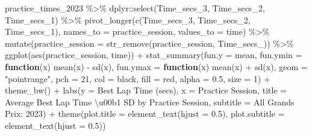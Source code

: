 \documentclass[
]{book}
\newenvironment{Shaded}{\begin{snugshade}}{\end{snugshade}}
\newcommand{\AttributeTok}[1]{\textcolor[rgb]{0.77,0.63,0.00}{#1}}
\newcommand{\ControlFlowTok}[1]{\textcolor[rgb]{0.13,0.29,0.53}{\textbf{#1}}}
\newcommand{\DecValTok}[1]{\textcolor[rgb]{0.00,0.00,0.81}{#1}}
\newcommand{\FloatTok}[1]{\textcolor[rgb]{0.00,0.00,0.81}{#1}}
\newcommand{\FunctionTok}[1]{\textcolor[rgb]{0.00,0.00,0.00}{#1}}
\newcommand{\NormalTok}[1]{#1}
\newcommand{\SpecialCharTok}[1]{\textcolor[rgb]{0.00,0.00,0.00}{#1}}
\newcommand{\StringTok}[1]{\textcolor[rgb]{0.31,0.60,0.02}{#1}}
\begin{document}
\begin{Shaded}
\begin{Highlighting}[]
\NormalTok{practice\_times\_2023 }\SpecialCharTok{\%\textgreater{}\%}
\NormalTok{  dplyr}\SpecialCharTok{::}\FunctionTok{select}\NormalTok{(Time\_secs\_3, Time\_secs\_2, Time\_secs\_1) }\SpecialCharTok{\%\textgreater{}\%}
  \FunctionTok{pivot\_longer}\NormalTok{(}\FunctionTok{c}\NormalTok{(Time\_secs\_3, Time\_secs\_2, Time\_secs\_1), }\AttributeTok{names\_to =} \StringTok{\textquotesingle{}practice\_session\textquotesingle{}}\NormalTok{, }\AttributeTok{values\_to =} \StringTok{\textquotesingle{}time\textquotesingle{}}\NormalTok{) }\SpecialCharTok{\%\textgreater{}\%}
  \FunctionTok{mutate}\NormalTok{(}\AttributeTok{practice\_session =} \FunctionTok{str\_remove}\NormalTok{(practice\_session, }\StringTok{\textquotesingle{}Time\_secs\_\textquotesingle{}}\NormalTok{)) }\SpecialCharTok{\%\textgreater{}\%}
  \FunctionTok{ggplot}\NormalTok{(}\FunctionTok{aes}\NormalTok{(practice\_session, time)) }\SpecialCharTok{+}
  \FunctionTok{stat\_summary}\NormalTok{(}\AttributeTok{fun.y =}\NormalTok{ mean,}
               \AttributeTok{fun.ymin =} \ControlFlowTok{function}\NormalTok{(x) }\FunctionTok{mean}\NormalTok{(x) }\SpecialCharTok{{-}} \FunctionTok{sd}\NormalTok{(x), }
               \AttributeTok{fun.ymax =} \ControlFlowTok{function}\NormalTok{(x) }\FunctionTok{mean}\NormalTok{(x) }\SpecialCharTok{+} \FunctionTok{sd}\NormalTok{(x), }
               \AttributeTok{geom =} \StringTok{"pointrange"}\NormalTok{,}
               \AttributeTok{pch =} \DecValTok{21}\NormalTok{, }\AttributeTok{col =} \StringTok{\textquotesingle{}black\textquotesingle{}}\NormalTok{, }\AttributeTok{fill =}  \StringTok{\textquotesingle{}red\textquotesingle{}}\NormalTok{, }\AttributeTok{alpha =} \FloatTok{0.5}\NormalTok{, }\AttributeTok{size =} \DecValTok{1}\NormalTok{) }\SpecialCharTok{+}
  \FunctionTok{theme\_bw}\NormalTok{() }\SpecialCharTok{+}
  \FunctionTok{labs}\NormalTok{(}\AttributeTok{y =} \StringTok{\textquotesingle{}Best Lap Time (secs)\textquotesingle{}}\NormalTok{,}
       \AttributeTok{x =} \StringTok{\textquotesingle{}Practice Session\textquotesingle{}}\NormalTok{,}
       \AttributeTok{title =} \StringTok{\textquotesingle{}Average Best Lap Time \textbackslash{}u00b1 SD by Practice Session\textquotesingle{}}\NormalTok{,}
       \AttributeTok{subtitle =} \StringTok{\textquotesingle{}All Grands Prix: 2023\textquotesingle{}}\NormalTok{) }\SpecialCharTok{+}
  \FunctionTok{theme}\NormalTok{(}\AttributeTok{plot.title =} \FunctionTok{element\_text}\NormalTok{(}\AttributeTok{hjust =} \FloatTok{0.5}\NormalTok{),}
        \AttributeTok{plot.subtitle =} \FunctionTok{element\_text}\NormalTok{(}\AttributeTok{hjust =} \FloatTok{0.5}\NormalTok{))}
\end{Highlighting}
\end{Shaded}
\end{document}
